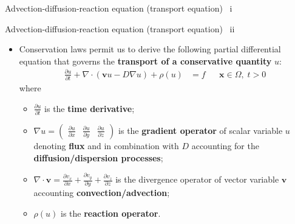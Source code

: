 \begin{frame}{Advection-diffusion-reaction equation (transport equation) \, i}
\begin{itemize}
\end{itemize}
\end{frame}
\begin{frame}{Advection-diffusion-reaction equation (transport equation) \, ii}
	\begin{itemize}
		\item Conservation laws permit us to derive the following partial differential
		equation that governs the {\bf transport of a conservative quantity} $u$:
		{
			\small
			\begin{align*}
				\frac{\partial u}{\partial t}+\nabla\cdot(\boldsymbol{v}u-D\nabla u) + \rho (u) & =f &  & \boldsymbol{x}\in\Omega,\;t>0
			\end{align*}
		}
		where \\[5pt]
		\begin{itemize}
			\item $\frac{\partial u}{\partial t}$ is the  \alert{\bf time derivative};\\[2pt]
			\item $\nabla u = \begin{pmatrix}\tfrac{\partial u}{\partial x} & \tfrac{\partial u}{\partial y} & \tfrac{\partial u}{\partial z}\end{pmatrix} $ is the \alert{\bf gradient operator} of scalar variable $u$ denoting \alert{\bf flux} and in combination with $D$ accounting for the \alert{\bf diffusion/dispersion processes}; \\[2pt]
			\item $\nabla\cdot\boldsymbol{v} =\tfrac{\partial v_{x}}{\partial x}+\tfrac{\partial v_{y}}{\partial y}+\tfrac{\partial v_{z}}{\partial z}$ is the \alert{divergence operator} of vector
			variable $\boldsymbol{v}$ accounting \alert{\bf convection/advection};\\[2pt]
			\item $\rho (u)$ is the \alert{\bf reaction operator}. 
		\end{itemize}
	\end{itemize}
\end{frame}
